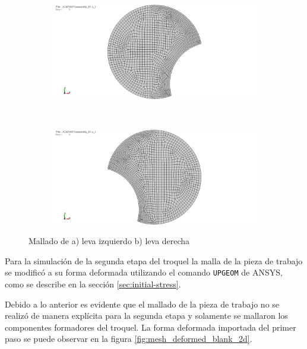 \begin{figure}[H]
\centering
\begin{subfigure}[t]{0.4\textwidth}
	\centering
	\includegraphics[width=\textwidth]{src/ch3/mesh_leva_izq_2d.png}
	\caption{}
	\label{fig:mesh_leva_izq_2d}
\end{subfigure}
~ 
\begin{subfigure}[t]{0.4\textwidth}
	\centering
	\includegraphics[width=\textwidth]{src/ch3/mesh_leva_der_2d.png}
	\caption{}
	\label{fig:mesh_leva_der_2d}
\end{subfigure}
\caption{Mallado de a) leva izquierdo b) leva derecha}
\end{figure}

Para la simulación de la segunda etapa del troquel la malla de la pieza de trabajo se modificó 
a su forma deformada utilizando el comando \texttt{UPGEOM} de ANSYS\faCopyright, como se 
describe en la sección \ref{sec:initial-stress}.

Debido a lo anterior es evidente que el mallado de la pieza de trabajo no se realizó de 
manera explícita para la segunda etapa y solamente se mallaron los componentes formadores 
del troquel. La forma deformada importada del primer paso 
se puede observar en la figura \ref{fig:mesh_deformed_blank_2d}.  \\

